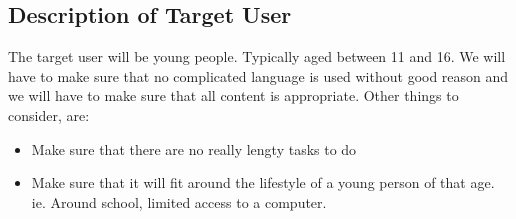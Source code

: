 \documentclass{article}
\begin{document}
\subsection{Description of Target User}
The target user will be young people. Typically aged between 11 and 16.
We will have to make sure that no complicated language is used without good
reason and we will have to make sure that all content is appropriate. Other
things to consider, are:
\begin{itemize}
	\item{Make sure that there are no really lengty tasks to do}
	\item{Make sure that it will fit around the lifestyle of a young
		person of that age. ie. Around school, limited access
		to a computer.}
\end{itemize}
\end{document}
